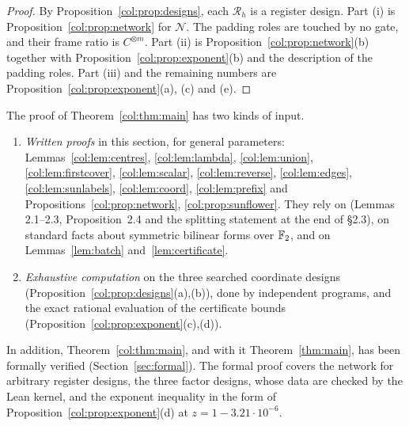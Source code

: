 \begin{proof}
By Proposition~\ref{col:prop:designs}, each $\mathcal R_h$ is a register design. Part (i) is
Proposition~\ref{col:prop:network} for $\mathcal N$. The padding roles are touched by no gate, and their frame
ratio is $C^{\otimes m}$. Part (ii) is Proposition~\ref{col:prop:network}(b) together with
Proposition~\ref{col:prop:exponent}(b) and the description of the padding roles. Part (iii) and the
remaining numbers are Proposition~\ref{col:prop:exponent}(a), (c) and (e).
\end{proof}

\begin{remark}\label{col:rem:status}
The proof of Theorem~\ref{col:thm:main} has two kinds of input.
\begin{enumerate}
\item[(1)] \emph{Written proofs} in this section, for general parameters:
  Lemmas~\ref{col:lem:centres}, \ref{col:lem:lambda}, \ref{col:lem:union}, \ref{col:lem:firstcover},
  \ref{col:lem:scalar}, \ref{col:lem:reverse}, \ref{col:lem:edges}, \ref{col:lem:sunlabels},
  \ref{col:lem:coord}, \ref{col:lem:prefix} and Propositions~\ref{col:prop:network},
  \ref{col:prop:sunflower}. They rely on \cite[\S2]{oai} (Lemmas 2.1--2.3, Proposition~2.4 and the
  splitting statement at the end of \S2.3), on standard facts about symmetric bilinear forms over $\mathbb{F}_2$,
  and on Lemmas~\ref{lem:batch} and~\ref{lem:certificate}.
\item[(2)] \emph{Exhaustive computation} on the three searched coordinate designs
  (Proposition~\ref{col:prop:designs}(a),(b)), done by independent programs, and the exact rational
  evaluation of the certificate bounds (Proposition~\ref{col:prop:exponent}(c),(d)).
\end{enumerate}
In addition, Theorem~\ref{col:thm:main}, and with it Theorem~\ref{thm:main}, has been formally
verified (Section~\ref{sec:formal}). The formal proof covers the network for arbitrary register
designs, the three factor designs, whose data are checked by the Lean kernel, and the exponent
inequality in the form of Proposition~\ref{col:prop:exponent}(d) at $z=1-3.21\cdot10^{-6}$.
\end{remark}
